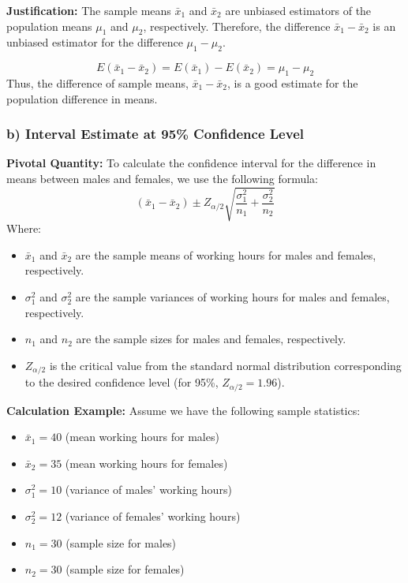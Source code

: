 \documentclass[12pt,a4paper]{article}
\begin{document}
\textbf{Justification:}
The sample means \(\bar{x}_1\) and \(\bar{x}_2\) are unbiased estimators of the population means \(\mu_1\) and \(\mu_2\), respectively. Therefore, the difference \(\bar{x}_1 - \bar{x}_2\) is an unbiased estimator for the difference \(\mu_1 - \mu_2\).

\[
E(\bar{x}_1 - \bar{x}_2) = E(\bar{x}_1) - E(\bar{x}_2) = \mu_1 - \mu_2
\]
Thus, the difference of sample means, \(\bar{x}_1 - \bar{x}_2\), is a good estimate for the population difference in means.

\subsubsection{b) Interval Estimate at 95\% Confidence Level}

\textbf{Pivotal Quantity:}
To calculate the confidence interval for the difference in means between males and females, we use the following formula:
\[
(\bar{x}_1 - \bar{x}_2) \pm Z_{\alpha/2} \sqrt{\frac{\sigma_1^2}{n_1} + \frac{\sigma_2^2}{n_2}}
\]
Where:
\begin{itemize}
    \item \(\bar{x}_1\) and \(\bar{x}_2\) are the sample means of working hours for males and females, respectively.
    \item \(\sigma_1^2\) and \(\sigma_2^2\) are the sample variances of working hours for males and females, respectively.
    \item \(n_1\) and \(n_2\) are the sample sizes for males and females, respectively.
    \item \(Z_{\alpha/2}\) is the critical value from the standard normal distribution corresponding to the desired confidence level (for 95\%, \(Z_{\alpha/2} = 1.96\)).
\end{itemize}

\textbf{Calculation Example:}
Assume we have the following sample statistics:
\begin{itemize}
    \item \(\bar{x}_1 = 40\) (mean working hours for males)
    \item \(\bar{x}_2 = 35\) (mean working hours for females)
    \item \(\sigma_1^2 = 10\) (variance of males' working hours)
    \item \(\sigma_2^2 = 12\) (variance of females' working hours)
    \item \(n_1 = 30\) (sample size for males)
    \item \(n_2 = 30\) (sample size for females)
\end{itemize}
\end{document}
